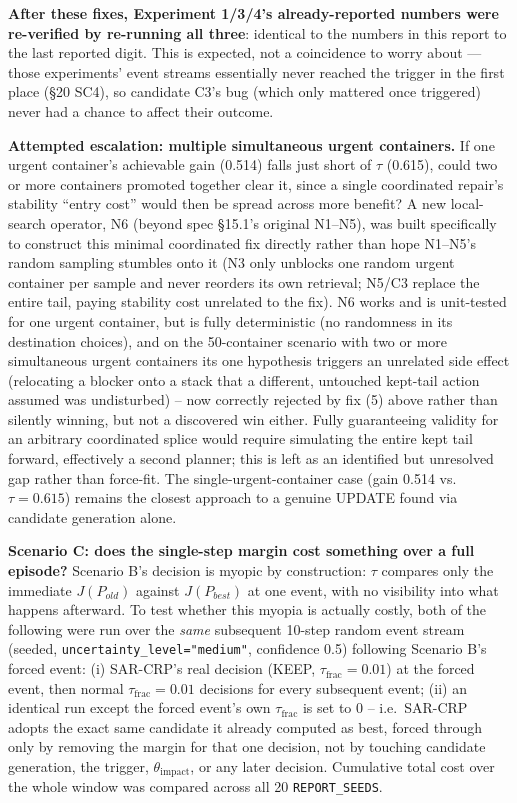 \documentclass[11pt]{article}
\begin{document}
\textbf{After these fixes, Experiment 1/3/4's already-reported numbers were
re-verified by re-running all three}: identical to the numbers in this
report to the last reported digit. This is expected, not a coincidence to
worry about --- those experiments' event streams essentially never reached
the trigger in the first place (\S20 SC4), so candidate C3's bug (which
only mattered once triggered) never had a chance to affect their outcome.

\textbf{Attempted escalation: multiple simultaneous urgent containers.} If
one urgent container's achievable gain (0.514) falls just short of $\tau$
(0.615), could two or more containers promoted together clear it, since a
single coordinated repair's stability ``entry cost'' would then be spread
across more benefit? A new local-search operator, N6 (beyond spec \S15.1's
original N1--N5), was built specifically to construct this minimal
coordinated fix directly rather than hope N1--N5's random sampling stumbles
onto it (N3 only unblocks one random urgent container per sample and never
reorders its own retrieval; N5/C3 replace the entire tail, paying stability
cost unrelated to the fix). N6 works and is unit-tested for one urgent
container, but is fully deterministic (no randomness in its destination
choices), and on the 50-container scenario with two or more simultaneous
urgent containers its one hypothesis triggers an unrelated side effect
(relocating a blocker onto a stack that a different, untouched kept-tail
action assumed was undisturbed) -- now correctly rejected by fix (5) above
rather than silently winning, but not a discovered win either. Fully
guaranteeing validity for an arbitrary coordinated splice would require
simulating the entire kept tail forward, effectively a second planner; this
is left as an identified but unresolved gap rather than force-fit. The
single-urgent-container case (gain 0.514 vs.\ $\tau=0.615$) remains the
closest approach to a genuine UPDATE found via candidate generation alone.

\textbf{Scenario C: does the single-step margin cost something over a full
episode?} Scenario B's decision is myopic by construction: $\tau$ compares
only the immediate $J(P_{old})$ against $J(P_{best})$ at one event, with no
visibility into what happens afterward. To test whether this myopia is
actually costly, both of the following were run over the \emph{same}
subsequent 10-step random event stream (seeded, \texttt{uncertainty\_level="medium"},
confidence 0.5) following Scenario B's forced event: (i) SAR-CRP's real
decision (KEEP, $\tau_{\text{frac}}=0.01$) at the forced event, then normal
$\tau_{\text{frac}}=0.01$ decisions for every subsequent event; (ii) an
identical run except the forced event's own $\tau_{\text{frac}}$ is set to
0 -- i.e.\ SAR-CRP adopts the exact same candidate it already computed as
best, forced through only by removing the margin for that one decision, not
by touching candidate generation, the trigger, $\theta_{\text{impact}}$, or
any later decision. Cumulative total cost over the whole window was
compared across all 20 \texttt{REPORT\_SEEDS}.
\end{document}
